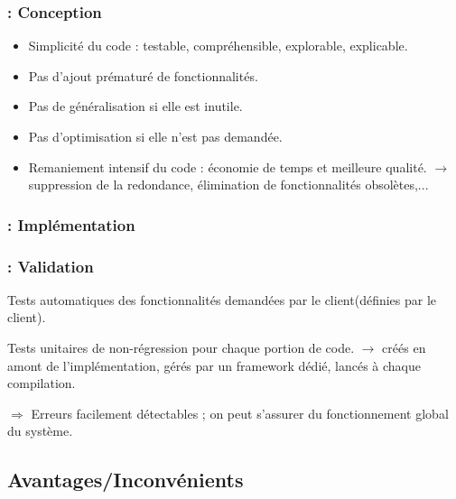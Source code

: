 \begin{frame}
\frametitle{\insertsubsection : Conception}
\begin{itemize}
\item Simplicité du code : testable, compréhensible, explorable, explicable.
\item Pas d'ajout prématuré de fonctionnalités.
\item Pas de généralisation si elle est inutile.
\item Pas d'optimisation si elle n'est pas demandée.
\item Remaniement intensif du code : économie de temps et meilleure qualité. $\rightarrow$ suppression de la redondance, élimination de fonctionnalités obsolètes,...
\end{itemize}
\end{frame}

\begin{frame}
\frametitle{\insertsubsection : Implémentation}

\end{frame}

\begin{frame}
\frametitle{\insertsubsection : Validation}
\item Tests automatiques des fonctionnalités demandées par le client(définies par le client).
\item Tests unitaires de non-régression pour chaque portion de code.
$\longrightarrow$ créés en amont de l'implémentation, gérés par un framework dédié, lancés à chaque compilation.
\item $\Rightarrow$ Erreurs facilement détectables ; on peut s'assurer du fonctionnement global du système.

\end{frame}

\subsection{Avantages/Inconvénients}
\begin{frame}
\frametitle{\insertsubsection}
\end{frame}
